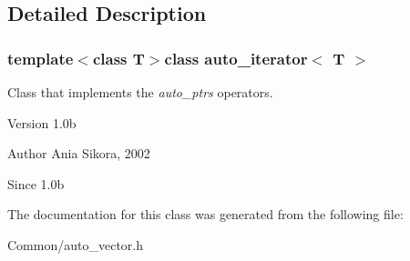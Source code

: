 \subsection{Detailed Description}
\subsubsection*{template$<$class T$>$class auto\-\_\-iterator$<$ T $>$}

Class that implements the {\itshape auto\-\_\-ptrs} operators. 

\begin{DoxyVersion}{Version}
1.\-0b 
\end{DoxyVersion}
\begin{DoxyAuthor}{Author}
Ania Sikora, 2002 
\end{DoxyAuthor}
\begin{DoxySince}{Since}
1.\-0b 
\end{DoxySince}


The documentation for this class was generated from the following file\-:\begin{DoxyCompactItemize}
\item 
Common/auto\-\_\-vector.\-h\end{DoxyCompactItemize}
